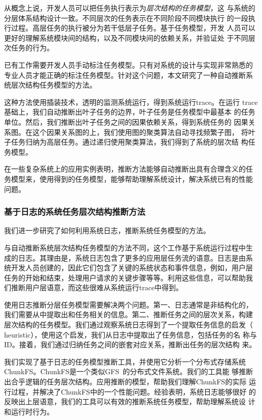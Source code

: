 从概念上说，开发人员可以把任务执行表示为\emph{层次结构的任务模型}，这
与系统的分层体系结构设计一致。不同层次的任务表示在不同阶段不同模块执行
的一段执行过程。高层任务的执行被分为若干低层子任务。基于任务模型，开发
人员可以更好的理解系统模块间的结构，以及不同模块间的依赖关系，并验证处
于不同层次任务的行为。

已有工作需要开发人员手动标注任务模型。只有对系统的设计与实现非常熟悉的
专业人员才能正确的标注任务模型。针对这个问题，本文研究了一种自动推断系
统层次结构任务模型的方法。

这种方法使用插装技术，透明的监测系统运行，得到系统运行trace。在运行
trace基础上，我们自动推断出叶子任务的边界，叶子任务是任务模型中最基本
的任务单位。然后，我们推断出叶子任务之间的因果依赖关系，得到系统任务的
因果关系图。在这个因果关系图的上，我们使用图的聚类算法自动寻找频繁子图，
将叶子任务归纳为高层任务。通过递归使用聚类算法，我们得到了系统的层次结
构任务模型。

在一些复杂系统上的应用实例表明，推断方法能够自动推断出具有合理含义的任
务模型来，使用得到的任务模型，能够帮助理解系统设计，解决系统已有的性能
问题。

\subsubsection*{基于日志的系统任务层次结构推断方法}


我们进一步研究了如何利用系统日志，推断系统任务模型的方法。

与自动推断系统层次结构任务模型的方法不同，这个工作基于系统运行过程中生
成的日志。其理由是，系统日志包含了更多的应用层任务流的语意。日志是由系
统开发人员创建的，因此它们包含了关键的系统状态和事件信息，例如，用户层
任务的开始和结束，处理用户请求的关键步骤等等。利用这些信息，可以帮助我
们推断用户层语意，而这些很难从系统运行trace中得到。

使用日志推断分层任务模型需要解决两个问题。第一、日志通常是非结构化的，
我们需要从中提取出和任务相关的信息。第二、推断任务之间的层次关系，构建
层次结构的任务模型。我们通过观察系统日志得到了一个提取任务信息的启发（
heuristic），使用这个启发，我们从日志中提取出了任务信息，包括任务的名
称与ID。接着，我们通过归纳任务之间的嵌套对应关系，推断出任务的层次结构
来。

我们实现了基于日志的任务模型推断工具，并使用它分析一个分布式存储系统
ChunkFS。ChunkFS是一个类似GFS~\cite{gfs}的分布式文件系统。我们的工具能
够推断出合乎逻辑的任务层次结构。应用推断的模型，帮助我们理解ChunkFS的实际
运行过程，并解决了ChunkFS中的一个性能问题。经验表明，系统日志能够很好
的反映出上层语意，我们的工具可以有效的推断系统任务模型，帮助理解系统设
计和运行时行为。

